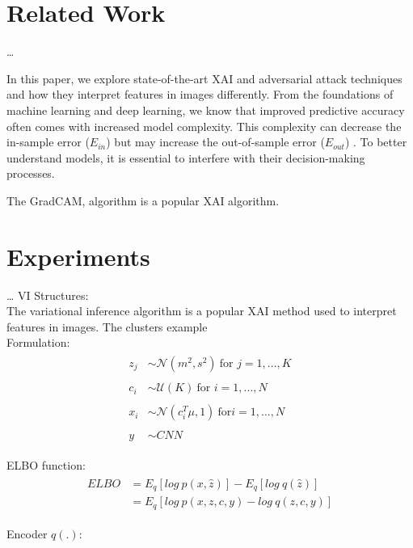 \documentclass[12pt]{article}
\begin{document}
\section{Related Work}
\ldots

In this paper, we explore state-of-the-art XAI and adversarial attack techniques and how they interpret features in images differently. 
From the foundations of machine learning and deep learning, we know that improved predictive accuracy often comes with increased model complexity. 
This complexity can decrease the in-sample error ($E_{in}$) but may increase the out-of-sample error ($E_{out}$) \cite{Shalev-Shwartz2014, Devroye1996, Hastie2017}. 
To better understand models, it is essential to interfere with their decision-making processes.

The GradCAM\cite{Selvaraju2020}, algorithm is a popular XAI algorithm. 
\section{Experiments}
\ldots
VI Structures:\\

The variational inference algorithm is a popular XAI method used to interpret features in images.
The clusters example\cite{Blei2017} \\

Formulation:
\begin{align} 
  \begin{split}
z_j & \sim \mathcal{N}(m^2, s^2)~\text{for } j = 1, ..., K \\\\
c_i & \sim \mathcal{U}(K)~\text{for } i = 1, ..., N \\\\ 
x_i & \sim \mathcal{N}(c_i^T \mu, 1)~\text{for} i = 1, ..., N \\\\
y  & \sim CNN
  \end{split}
\end{align}

ELBO function:
\begin{align}
  \begin{split}
ELBO & = E_q[log~p(x,\hat{z})] - E_q[log~q(\hat{z})]\\
 &= E_q[log~p(x,z,c,y) - log~q(z,c,y)]
  \end{split}
\end{align}

Encoder $q(.)$:
\end{document}
